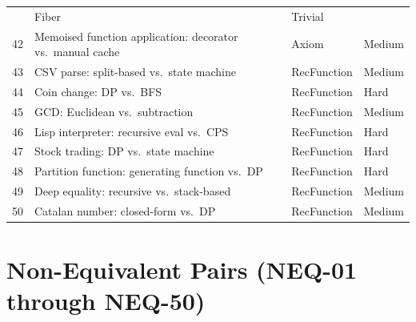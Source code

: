 \begin{center}
\begin{tabular}{r p{5.5cm} l l}
     & Fiber & Trivial \\
  42 & Memoised function application: decorator vs.\ manual cache
     & Axiom & Medium \\
  43 & CSV parse: split-based vs.\ state machine
     & RecFunction & Medium \\
  44 & Coin change: DP vs.\ BFS
     & RecFunction & Hard \\
  45 & GCD: Euclidean vs.\ subtraction
     & RecFunction & Medium \\
  46 & Lisp interpreter: recursive eval vs.\ CPS
     & RecFunction & Hard \\
  47 & Stock trading: DP vs.\ state machine
     & RecFunction & Hard \\
  48 & Partition function: generating function vs.\ DP
     & RecFunction & Hard \\
  49 & Deep equality: recursive vs.\ stack-based
     & RecFunction & Medium \\
  50 & Catalan number: closed-form vs.\ DP
     & RecFunction & Medium \\
\end{tabular}
\end{center}

\section{Non-Equivalent Pairs (NEQ-01 through NEQ-50)}


